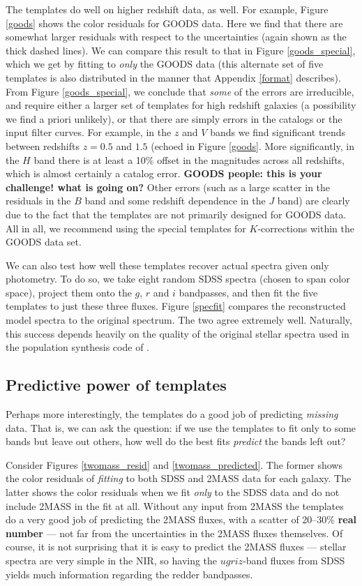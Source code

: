\documentclass[10pt,preprint]{aastex}
\begin{document}
The templates do well on higher redshift data, as well. For example,
Figure \ref{goods} shows the color residuals for GOODS data. Here we
find that there are somewhat larger residuals with respect to the
uncertainties (again shown as the thick dashed lines). We can compare
this result to that in Figure \ref{goods_special}, which we get by
fitting to {\it only} the GOODS data (this alternate set of five
templates is also distributed in the manner that Appendix \ref{format}
describes). From Figure \ref{goods_special}, we conclude that {\it
some} of the errors are irreducible, and require either a larger set
of templates for high redshift galaxies (a possibility we find a
priori unlikely), or that there are simply errors in the catalogs or
the input filter curves. For example, in the $z$ and $V$ bands we find
significant trends between redshifts $z=0.5$ and $1.5$ (echoed in
Figure \ref{goods}. More significantly, in the $H$ band there is at
least a 10\% offset in the magnitudes across all redshifts, which is
almost certainly a catalog error.  {\bf GOODS people: this is your
challenge! what is going on?} Other errors (such as a large scatter in
the residuals in the $B$ band and some redshift dependence in the $J$
band) are clearly due to the fact that the templates are not primarily
designed for GOODS data. All in all, we recommend using the special
templates for $K$-corrections within the GOODS data set.

We can also test how well these templates recover actual spectra given
only photometry. To do so, we take eight random SDSS spectra (chosen
to span color space), project them onto the $g$, $r$ and $i$
bandpasses, and then fit the five templates to just these three
fluxes.  Figure \ref{specfit} compares the reconstructed model spectra
to the original spectrum. The two agree extremely well. Naturally,
this success depends heavily on the quality of the original stellar
spectra used in the population synthesis code of \citet{bruzual03a}. 

\subsection{Predictive power of templates}

Perhaps more interestingly, the templates do a good job of predicting
{\it missing} data. That is, we can ask the question: if we use the
templates to fit only to some bands but leave out others, how well do
the best fits {\it predict} the bands left out?
    
Consider Figures \ref{twomass_resid} and \ref{twomass_predicted}. The
former shows the color residuals of {\it fitting} to both SDSS and
2MASS data for each galaxy. The latter shows the color residuals when
we fit {\it only} to the SDSS data and do not include 2MASS in the fit
at all. Without any input from 2MASS the templates do a very good job
of predicting the 2MASS fluxes, with a scatter of 20--30\% {\bf real
number} --- not far from the uncertainties in the 2MASS fluxes
themselves. Of course, it is not surprising that it is easy to predict
the 2MASS fluxes --- stellar spectra are very simple in the NIR, so
having the $ugriz$-band fluxes from SDSS yields much information
regarding the redder bandpasses.
\end{document}
